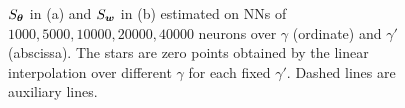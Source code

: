 \documentclass[twoside,11pt]{article}
\begin{document}
\begin{figure}
    \begin{centering}
        \par\end{centering}
    \caption{$S_{\bm{\theta}}$ in (a) and $S_{\bm{w}}$ in (b) estimated on NNs of $1000,5000,10000,20000,40000$ neurons over $\gamma$ (ordinate) and $\gamma'$ (abscissa). The stars are zero points obtained by the linear interpolation over different $\gamma$ for each fixed $\gamma'$. Dashed lines are auxiliary lines.   \label{fig:theta_a_slope} }
\end{figure}
\end{document}
